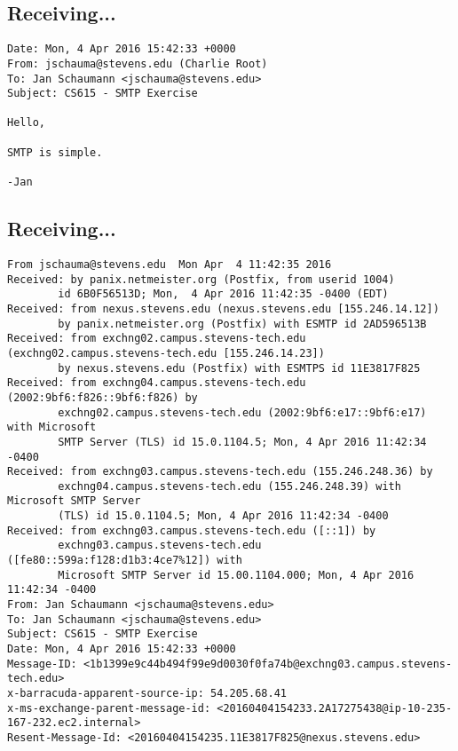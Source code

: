 \documentclass[xga]{xdvislides}
\begin{document}
\subsection{Receiving...}
\begin{verbatim}
Date: Mon, 4 Apr 2016 15:42:33 +0000
From: jschauma@stevens.edu (Charlie Root)
To: Jan Schaumann <jschauma@stevens.edu>
Subject: CS615 - SMTP Exercise

Hello,

SMTP is simple.

-Jan
\end{verbatim}

\subsection{Receiving...}
\smallish
\begin{verbatim}
From jschauma@stevens.edu  Mon Apr  4 11:42:35 2016
Received: by panix.netmeister.org (Postfix, from userid 1004)
        id 6B0F56513D; Mon,  4 Apr 2016 11:42:35 -0400 (EDT)
Received: from nexus.stevens.edu (nexus.stevens.edu [155.246.14.12])
        by panix.netmeister.org (Postfix) with ESMTP id 2AD596513B
Received: from exchng02.campus.stevens-tech.edu (exchng02.campus.stevens-tech.edu [155.246.14.23])
        by nexus.stevens.edu (Postfix) with ESMTPS id 11E3817F825
Received: from exchng04.campus.stevens-tech.edu (2002:9bf6:f826::9bf6:f826) by
        exchng02.campus.stevens-tech.edu (2002:9bf6:e17::9bf6:e17) with Microsoft
        SMTP Server (TLS) id 15.0.1104.5; Mon, 4 Apr 2016 11:42:34 -0400
Received: from exchng03.campus.stevens-tech.edu (155.246.248.36) by
        exchng04.campus.stevens-tech.edu (155.246.248.39) with Microsoft SMTP Server
        (TLS) id 15.0.1104.5; Mon, 4 Apr 2016 11:42:34 -0400
Received: from exchng03.campus.stevens-tech.edu ([::1]) by
        exchng03.campus.stevens-tech.edu ([fe80::599a:f128:d1b3:4ce7%12]) with
        Microsoft SMTP Server id 15.00.1104.000; Mon, 4 Apr 2016 11:42:34 -0400
From: Jan Schaumann <jschauma@stevens.edu>
To: Jan Schaumann <jschauma@stevens.edu>
Subject: CS615 - SMTP Exercise
Date: Mon, 4 Apr 2016 15:42:33 +0000
Message-ID: <1b1399e9c44b494f99e9d0030f0fa74b@exchng03.campus.stevens-tech.edu>
x-barracuda-apparent-source-ip: 54.205.68.41
x-ms-exchange-parent-message-id: <20160404154233.2A17275438@ip-10-235-167-232.ec2.internal>
Resent-Message-Id: <20160404154235.11E3817F825@nexus.stevens.edu>
\end{verbatim}
\end{document}
